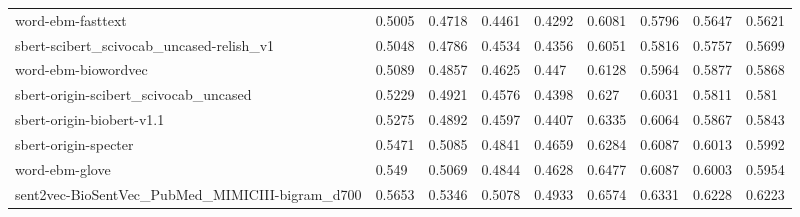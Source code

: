 \begin{table}
\begin{tabular}{lllllllll}
word-ebm-fasttext                                &   0.5005 &  0.4718 &  0.4461 &  0.4292 &   0.6081 &  0.5796 &  0.5647 &  0.5621 \\
sbert-scibert\_scivocab\_uncased-relish\_v1         &   0.5048 &  0.4786 &  0.4534 &  0.4356 &   0.6051 &  0.5816 &  0.5757 &  0.5699 \\
word-ebm-biowordvec                              &   0.5089 &  0.4857 &  0.4625 &   0.447 &   0.6128 &  0.5964 &  0.5877 &  0.5868 \\
sbert-origin-scibert\_scivocab\_uncased            &   0.5229 &  0.4921 &  0.4576 &  0.4398 &    0.627 &  0.6031 &  0.5811 &   0.581 \\
sbert-origin-biobert-v1.1                        &   0.5275 &  0.4892 &  0.4597 &  0.4407 &   0.6335 &  0.6064 &  0.5867 &  0.5843 \\
sbert-origin-specter                             &   0.5471 &  0.5085 &  0.4841 &  0.4659 &   0.6284 &  0.6087 &  0.6013 &  0.5992 \\
word-ebm-glove                                   &    0.549 &  0.5069 &  0.4844 &  0.4628 &   0.6477 &  0.6087 &  0.6003 &  0.5954 \\
sent2vec-BioSentVec\_PubMed\_MIMICIII-bigram\_d700  &   0.5653 &  0.5346 &  0.5078 &  0.4933 &   0.6574 &  0.6331 &  0.6228 &  0.6223 \\
\bottomrule
\end{tabular}
\end{table}


